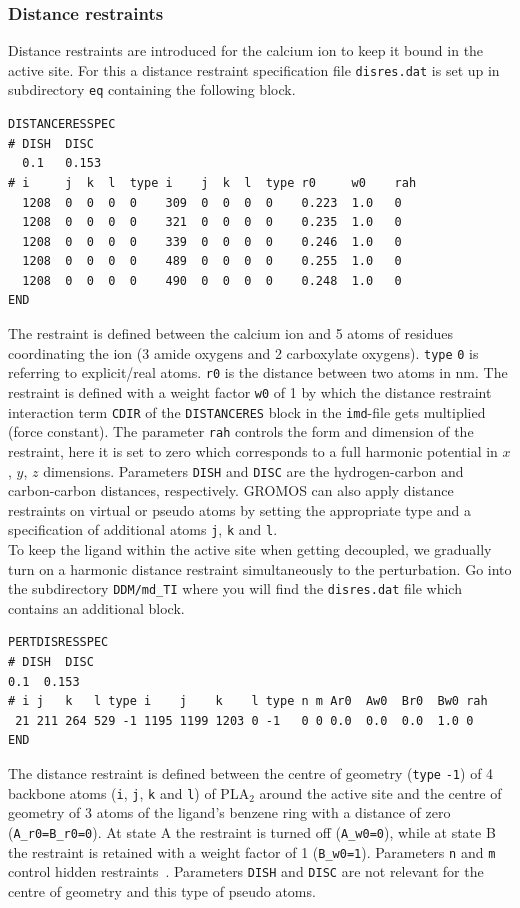 \subsubsection{Distance restraints}
Distance restraints are introduced for the calcium ion to keep it bound in the active site. For this a distance restraint specification file \texttt{disres.dat} is set up in subdirectory \texttt{eq} containing the following block.
\begin{lstlisting}[columns=flexible]
DISTANCERESSPEC
# DISH  DISC
  0.1   0.153
# i     j  k  l  type i    j  k  l  type r0     w0    rah
  1208  0  0  0  0    309  0  0  0  0    0.223  1.0   0
  1208  0  0  0  0    321  0  0  0  0    0.235  1.0   0
  1208  0  0  0  0    339  0  0  0  0    0.246  1.0   0
  1208  0  0  0  0    489  0  0  0  0    0.255  1.0   0
  1208  0  0  0  0    490  0  0  0  0    0.248  1.0   0
END
\end{lstlisting}
The restraint is defined between the calcium ion and 5 atoms of residues coordinating the ion (3 amide oxygens and 2 carboxylate oxygens). \texttt{type} \texttt{0} is referring to explicit/real atoms. \texttt{r0} is the distance between two atoms in nm. The restraint is defined with a weight factor \texttt{w0} of 1 by which the distance restraint interaction term \texttt{CDIR} of the \texttt{DISTANCERES} block in the \texttt{imd}-file gets multiplied (force constant). The parameter \texttt{rah} controls the form and dimension of the restraint, here it is set to zero which corresponds to a full harmonic potential in $x$, $y$, $z$ dimensions. Parameters \texttt{DISH} and \texttt{DISC} are the hydrogen-carbon and carbon-carbon distances, respectively. GROMOS can also apply distance restraints on virtual or pseudo atoms by setting the appropriate type and a specification of additional atoms \texttt{j}, \texttt{k} and \texttt{l}. \\

To keep the ligand within the active site when getting decoupled, we gradually turn on a harmonic distance restraint simultaneously to the perturbation. Go into the subdirectory \texttt{DDM/md\_TI} where you will find the \texttt{disres.dat} file which contains an additional block.
\begin{lstlisting}
PERTDISRESSPEC
# DISH  DISC
0.1  0.153
# i j   k   l type i    j    k    l type n m Ar0  Aw0  Br0  Bw0 rah
 21 211 264 529 -1 1195 1199 1203 0 -1   0 0 0.0  0.0  0.0  1.0 0
END 
\end{lstlisting}

The distance restraint is defined between the centre of geometry (\texttt{type} \texttt{-1}) of 4 backbone atoms (\texttt{i}, \texttt{j}, \texttt{k} and \texttt{l}) of PLA$_2$ around the active site and the centre of geometry of 3 atoms of the ligand's benzene ring with a distance of zero (\texttt{A\_r0=B\_r0=0}). At state A the restraint is turned off (\texttt{A\_w0=0}), while at state B the restraint is retained with a weight factor of 1 (\texttt{B\_w0=1}). Parameters \texttt{n} and \texttt{m} control hidden 
restraints~\cite{Christen}. Parameters \texttt{DISH} and \texttt{DISC} are not relevant for the centre of geometry and this type of pseudo atoms.

